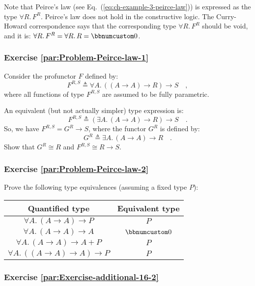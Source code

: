 Note that Peirce\textsf{'}s law (see Eq.~(\ref{eq:ch-example-3-peirce-law}))
is expressed as the type $\forall R.\,F^{R}$. Peirce\textsf{'}s law does not
hold in the constructive logic. The Curry-Howard correspondence says
that the corresponding type $\forall R.\,F^{R}$ should be void, and
it is: $\forall R.\,F^{R}=\forall R.\,R=\bbnum 0$. 

\subsubsection{Exercise \label{par:Problem-Peirce-law-1}\ref{par:Problem-Peirce-law-1}}

Consider the profunctor $F$ defined by:
\[
F^{R,S}\triangleq\forall A.\,((A\rightarrow A)\rightarrow R)\rightarrow S\quad,
\]
where all functions of type $F^{R,S}$ are assumed to be fully parametric. 

An equivalent (but not actually simpler) type expression is:
\[
F^{R,S}\triangleq(\exists A.\,(A\rightarrow A)\rightarrow R)\rightarrow S\quad.
\]
So, we have $F^{R,S}=G^{R}\rightarrow S$, where the functor $G^{R}$
is defined by:
\[
G^{R}\triangleq\exists A.\,(A\rightarrow A)\rightarrow R\quad.
\]
Show that $G^{R}\cong R$ and $F^{R,S}\cong R\rightarrow S$.


\subsubsection{Exercise \label{par:Problem-Peirce-law-2}\ref{par:Problem-Peirce-law-2}}

Prove the following type equivalences (assuming a fixed type $P$):

\begin{tabular}{|c|c|}
\hline 
\textbf{\footnotesize{}Quantified type} & \textbf{\footnotesize{}Equivalent type}\tabularnewline
\hline 
\hline 
$\forall A.\,(A\rightarrow A)\rightarrow P$ & $P$\tabularnewline
\hline 
$\forall A.\,(A\rightarrow A)\rightarrow A$ & $\bbnum 0$\tabularnewline
\hline 
$\forall A.\,(A\rightarrow A)\rightarrow A+P$ & $P$\tabularnewline
\hline 
$\forall A.\,((A\rightarrow A)\rightarrow A)\rightarrow P$ & $P$\tabularnewline
\hline 
\end{tabular}

\subsubsection{Exercise \label{par:Exercise-additional-16-2}\ref{par:Exercise-additional-16-2}}

